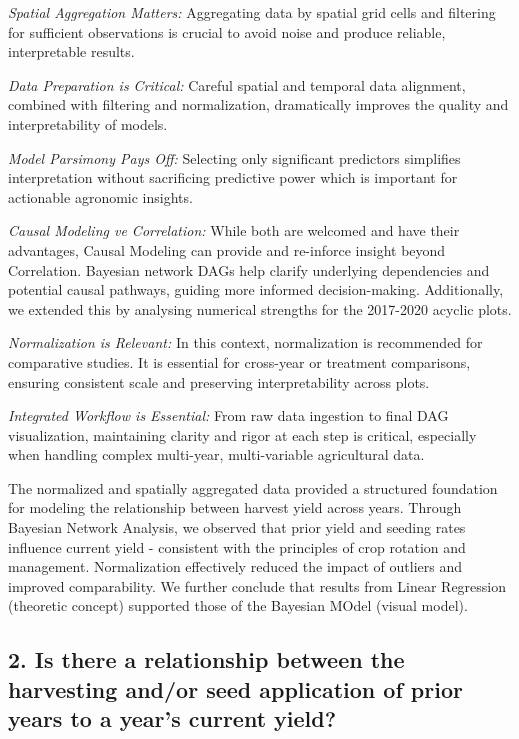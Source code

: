 \documentclass[
]{article}
\begin{document}
\emph{Spatial Aggregation Matters:} Aggregating data by spatial grid
cells and filtering for sufficient observations is crucial to avoid
noise and produce reliable, interpretable results.

\emph{Data Preparation is Critical:} Careful spatial and temporal data
alignment, combined with filtering and normalization, dramatically
improves the quality and interpretability of models.

\emph{Model Parsimony Pays Off:} Selecting only significant predictors
simplifies interpretation without sacrificing predictive power which is
important for actionable agronomic insights.

\emph{Causal Modeling ve Correlation:} While both are welcomed and have
their advantages, Causal Modeling can provide and re-inforce insight
beyond Correlation. Bayesian network DAGs help clarify underlying
dependencies and potential causal pathways, guiding more informed
decision-making. Additionally, we extended this by analysing numerical
strengths for the 2017-2020 acyclic plots.

\emph{Normalization is Relevant:} In this context, normalization is
recommended for comparative studies. It is essential for cross-year or
treatment comparisons, ensuring consistent scale and preserving
interpretability across plots.

\emph{Integrated Workflow is Essential:} From raw data ingestion to
final DAG visualization, maintaining clarity and rigor at each step is
critical, especially when handling complex multi-year, multi-variable
agricultural data.

The normalized and spatially aggregated data provided a structured
foundation for modeling the relationship between harvest yield across
years. Through Bayesian Network Analysis, we observed that prior yield
and seeding rates influence current yield - consistent with the
principles of crop rotation and management. Normalization effectively
reduced the impact of outliers and improved comparability. We further
conclude that results from Linear Regression (theoretic concept)
supported those of the Bayesian MOdel (visual model).

\subsection{2. Is there a relationship between the harvesting and/or
seed application of prior years to a year's current
yield?}\label{is-there-a-relationship-between-the-harvesting-andor-seed-application-of-prior-years-to-a-years-current-yield}
\end{document}
